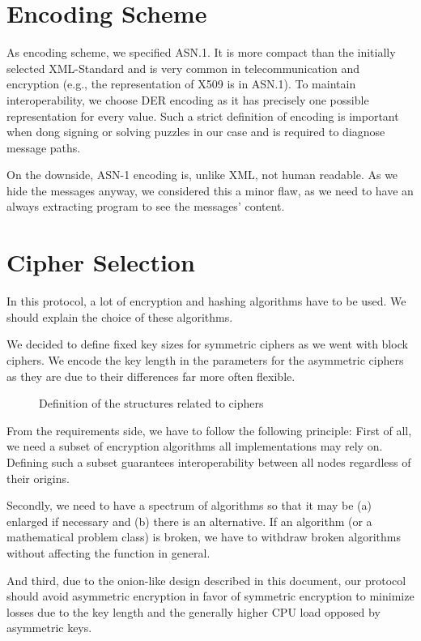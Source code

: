 \section{Encoding Scheme}
As encoding scheme, we specified ASN.1\cite{dis19878824}. It is more compact than the initially selected XML-Standard and is very common in telecommunication and encryption (e.g., the representation of X509 is in ASN.1). To maintain interoperability, we choose DER encoding as it has precisely one possible representation for every value. Such a strict definition of encoding is important when dong signing or solving puzzles in our case and is required to diagnose message paths.

On the downside, ASN-1 encoding is, unlike XML, not human readable. As we hide the messages anyway, we considered this a minor flaw, as we need to have an always extracting program to see the messages' content.

\section{Cipher Selection}
In this protocol, a lot of encryption and hashing algorithms have to be used. We should explain the choice of these algorithms. 

We decided to define fixed key sizes for symmetric ciphers as we went with block ciphers. We encode the key length in the parameters for the asymmetric ciphers as they are due to their differences far more often flexible.

\begin{figure}[ht]
	
	\caption{Definition of the structures related to ciphers}
	\label{fig:defCiphers}
\end{figure}

From the requirements side, we have to follow the following principle:
First of all, we need a subset of encryption algorithms all implementations may rely on. Defining such a subset guarantees interoperability between all nodes regardless of their origins. 

Secondly, we need to have a spectrum of algorithms so that it may be (a) enlarged if necessary and (b) there is an alternative. If an algorithm (or a mathematical problem class) is broken, we have to withdraw broken algorithms without affecting the function in general. 

And third, due to the onion-like design described in this document, our protocol should avoid asymmetric encryption in favor of symmetric encryption to minimize losses due to the key length and the generally higher CPU load opposed by asymmetric keys.

